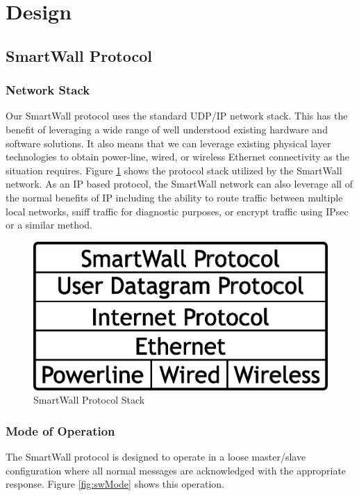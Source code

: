 \documentclass[11pt]{article}
\begin{document}
\section{Design}
\subsection{SmartWall Protocol}
\subsubsection{Network Stack}
\label{sec:Design.SmartWallProtocol.NetworkStack}
Our SmartWall protocol uses the standard UDP/IP network stack.
This has the benefit of
leveraging a wide range of well understood existing hardware and
software solutions. It also means that we can leverage existing physical layer
technologies to obtain power-line, wired, or wireless Ethernet
connectivity as the situation requires. Figure \ref{fig:swStack} shows
the protocol stack utilized by the SmartWall network. As an IP
based protocol, the SmartWall network can also leverage all of the
normal benefits of IP including the ability to route traffic between
multiple local networks, sniff traffic for diagnostic purposes, or
encrypt traffic using IPsec or a similar method.

\begin{figure}
  \begin{center}
    \includegraphics[scale=.5]{stack.pdf}
  \end{center}
  \caption{SmartWall Protocol Stack}
  \label{fig:swStack}
\end{figure}

\subsubsection{Mode of Operation}
\label{sec:Design.SmartWallProtocol.ModeofOperation}
The SmartWall protocol is designed to operate in a loose master/slave
configuration where all normal messages are acknowledged with the
appropriate response. Figure \ref{fig:swMode} shows this operation.
\end{document}
